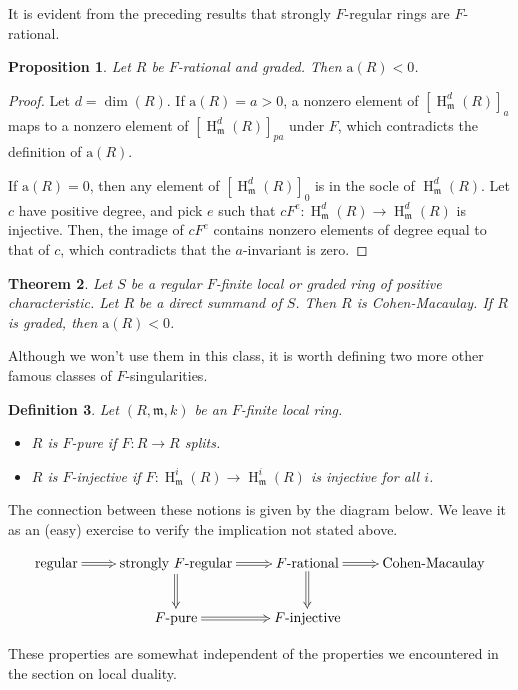 \documentclass[11pt]{book}
\newtheorem{theorem}{Theorem}[chapter]
\newtheorem{proposition}[theorem]{Proposition}
\newtheorem{definition}[theorem]{Definition}
\numberwithin{equation}{section}
\numberwithin{theorem}{chapter}
\theoremstyle{definition}
\newtheorem*{basic properties}{Basic Properties}
\newtheorem*{Important Remark}{Important Remark}
\theoremstyle{remark}
\newcommand{\m}{\mathfrak{m}}
\renewcommand{\dim}{\operatorname{dim}}
\newcommand{\ai}{\mathrm{a}}
\renewcommand{\H}{\operatorname{H}}
\begin{document}
It is evident from the preceding results that strongly $F$-regular rings are $F$-rational.

\begin{proposition}
	Let $R$ be $F$-rational and graded. Then $\ai(R)<0$.
\end{proposition}
\begin{proof}
	Let $d=\dim(R)$. If $\ai(R)=a>0$, a nonzero element of $[\H^d_\m(R)]_a$ maps to a nonzero element of $[\H^d_\m(R)]_{pa}$ under $F$, which contradicts the definition of $\ai(R)$.
	
	If $\ai(R)=0$, then any element of $[\H^d_\m(R)]_0$ is in the socle of $\H^d_\m(R)$. Let $c$ have positive degree, and pick $e$ such that $c F^e:\H^d_\m(R) \to \H^d_\m(R)$ is injective. Then, the image of $c F^e$ contains nonzero elements of degree equal to that of $c$, which contradicts that the $a$-invariant is zero.
\end{proof}

\begin{theorem}
	Let $S$ be a regular $F$-finite local or graded ring of positive characteristic. Let $R$ be a direct summand of $S$. Then $R$ is Cohen-Macaulay. If $R$ is graded, then $\ai(R)<0$.
\end{theorem}


Although we won't use them in this class, it is worth defining two more other famous classes of $F$-singularities.

\begin{definition}
	Let $(R,\m,k)$ be an $F$-finite local ring.\begin{itemize}
		\item $R$ is \emph{$F$-pure} if $F:R\to R$ splits.
		\item $R$ is \emph{$F$-injective} if $F:\H^i_\m(R)\to \H^i_\m(R)$ is injective for all $i$.
	\end{itemize}
\end{definition}

The connection between these notions is given by the diagram below. We leave it as an (easy) exercise to verify the implication not stated above.

\[ \xymatrix{ \text{regular} \ar@{=>}[r] & \text{strongly $F$-regular} \ar@{=>}[r] \ar@{=>}[d] & \text{$F$-rational} \ar@{=>}[r] \ar@{=>}[d] & \text{Cohen-Macaulay} \\
	& \text{$F$-pure} \ar@{=>}[r] & \text{$F$-injective} & }\]

These properties are somewhat independent of the properties we encountered in the section on local duality.
\end{document}
